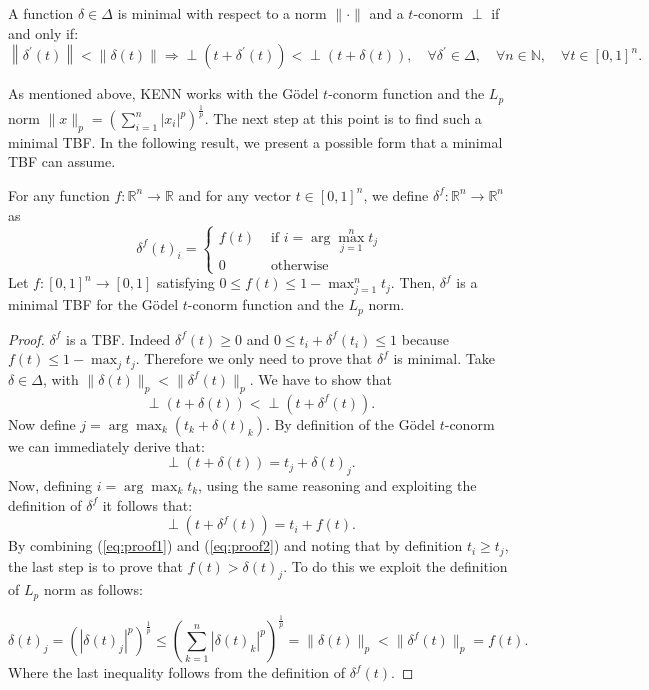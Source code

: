 \begin{definition}
	A function $\delta \in \Delta$ is minimal with respect to a norm $\|\cdot\|$ and a $t$-conorm $\perp$ if and only if:
	$$
	\left\|\delta^{\prime}(t)\right\|<\|\delta(t)\| \Rightarrow \perp\left(t+\delta^{\prime}(t)\right)<\perp(t+\delta(t)), \quad \forall \delta^{\prime} \in \Delta, \quad \forall n \in \mathbb{N}, \quad \forall t \in[0,1]^{n}.
	$$
\end{definition}

As mentioned above, KENN works with the Gödel $t$-conorm function and the $L_p$ norm $\|x\|_p = \left( \sum_{i=1}^n |x_i|^p \right)^{\frac{1}{p}}$.
The next step at this point is to find such a minimal TBF. In the following result, we present a possible form that a minimal TBF can assume.
\begin{theorem}
	\label{thm:min_tbf}
	For any function $f: \mathbb{R}^{n} \rightarrow \mathbb{R}$ and for any vector $t \in \left[0,1\right]^n$, we define \mbox{$\delta^{f}: \mathbb{R}^{n} \rightarrow \mathbb{R}^{n}$} as
	$$
	\delta^{f}(t)_{i}= \begin{cases}f(t) & \text { if } i=\arg\max_{j=1}^n t_{j} \\ 0 & \text { otherwise }\end{cases}
	$$
	Let $f: \left[0,1\right]^{n} \rightarrow \left[0,1\right]$ satisfying $0 \leq f(t) \leq 1- \max_{j=1}^n t_j$. Then, $\delta^f$ is a minimal TBF for the Gödel $t$-conorm function and the $L_p$ norm.
\end{theorem}
\begin{proof}
	$\delta^f$ is a TBF. Indeed $\delta^f(t) \geq 0$ and $0 \leq t_i + \delta^f(t_i) \leq 1$ because $f(t) \leq 1- \max_j t_j$. Therefore we only need to prove that $\delta^f$ is minimal. Take $\delta \in \Delta$, with $\|\delta(t)\|_p < \|\delta^f(t)\|_p$. We have to show that $$\perp\left(t+\delta\left(t\right)\right) < \perp\left(t+\delta^f\left(t\right)\right).$$ 
	Now define $j=\arg\max_k \left(t_k + \delta(t)_k\right)$. By definition of the Gödel $t$-conorm we can immediately derive that:
	\begin{equation}
	\perp(t+\delta(t)) = t_j+\delta(t)_j.
	\label{eq:proof1}
	\end{equation}
	Now, defining $i=\arg\max_k t_k$, using the same reasoning and exploiting the definition of $\delta^f$ it follows that:
	\begin{equation}
	\perp(t+\delta^f(t)) = t_i + f(t).
	\label{eq:proof2}
	\end{equation}
	By combining (\ref{eq:proof1}) and (\ref{eq:proof2}) and noting that by definition $t_i \geq t_j$, the last step is to prove that $f(t) > \delta(t)_j$. To do this we exploit the definition of $L_p$ norm as follows:
	
	$$ \delta(t)_j = (|\delta(t)_j|^p)^\frac{1}{p} \leq \left(\sum_{k=1}^{n}|\delta(t)_k|^p \right)^{\frac{1}{p}} = \|\delta(t)\|_p < \|\delta^f(t)\|_p = f(t). $$ 
	Where the last inequality follows from the definition of $\delta^f(t)$.
	
\end{proof}
